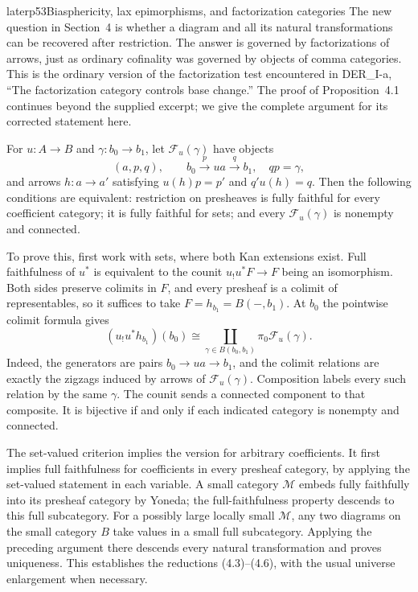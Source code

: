 \begin{dcomment}{later}{p53}{Biasphericity, lax epimorphisms, and factorization categories}
The new question in Section~4 is whether a diagram and all its natural transformations can be recovered after restriction. The answer is governed by factorizations of arrows, just as ordinary cofinality was governed by objects of comma categories. This is the ordinary version of the factorization test encountered in DER\_I-a, ``The factorization category controls base change.'' The proof of Proposition~4.1 continues beyond the supplied excerpt; we give the complete argument for its corrected statement here.

For $u:A\longrightarrow B$ and $\gamma:b_0\longrightarrow b_1$, let $\mathcal F_u(\gamma)$ have objects
\[
 (a,p,q),\qquad b_0\xrightarrow{p}u a\xrightarrow{q}b_1,
 \quad qp=\gamma,
\]
and arrows $h:a\longrightarrow a'$ satisfying $u(h)p=p'$ and $q'u(h)=q$. Then the following conditions are equivalent: restriction on presheaves is fully faithful for every coefficient category; it is fully faithful for sets; and every $\mathcal F_u(\gamma)$ is nonempty and connected.

To prove this, first work with sets, where both Kan extensions exist. Full faithfulness of $u^*$ is equivalent to the counit $u_!u^*F\longrightarrow F$ being an isomorphism. Both sides preserve colimits in $F$, and every presheaf is a colimit of representables, so it suffices to take $F=h_{b_1}=B(-,b_1)$. At $b_0$ the pointwise colimit formula gives
\[
 (u_!u^*h_{b_1})(b_0)
 \cong\coprod_{\gamma\in B(b_0,b_1)}
             \pi_0\mathcal F_u(\gamma).
\]
Indeed, the generators are pairs $b_0\longrightarrow u a\longrightarrow b_1$, and the colimit relations are exactly the zigzags induced by arrows of $\mathcal F_u(\gamma)$. Composition labels every such relation by the same $\gamma$. The counit sends a connected component to that composite. It is bijective if and only if each indicated category is nonempty and connected.

The set-valued criterion implies the version for arbitrary coefficients. It first implies full faithfulness for coefficients in every presheaf category, by applying the set-valued statement in each variable. A small category $\mathcal M$ embeds fully faithfully into its presheaf category by Yoneda; the full-faithfulness property descends to this full subcategory. For a possibly large locally small $\mathcal M$, any two diagrams on the small category $B$ take values in a small full subcategory. Applying the preceding argument there descends every natural transformation and proves uniqueness. This establishes the reductions (4.3)--(4.6), with the usual universe enlargement when necessary.


\end{dcomment}

